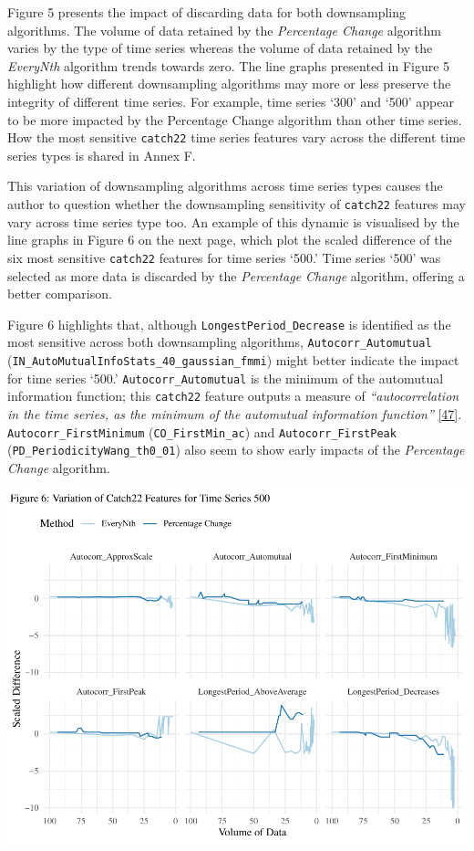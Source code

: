 \documentclass{article}
\begin{document}
Figure 5 presents the impact of discarding data for both downsampling
algorithms. The volume of data retained by the \emph{Percentage Change}
algorithm varies by the type of time series whereas the volume of data
retained by the \emph{EveryNth} algorithm trends towards zero. The line
graphs presented in Figure 5 highlight how different downsampling
algorithms may more or less preserve the integrity of different time
series. For example, time series `300' and `500' appear to be more
impacted by the Percentage Change algorithm than other time series. How
the most sensitive \texttt{catch22} time series features vary across the
different time series types is shared in Annex F.

This variation of downsampling algorithms across time series types
causes the author to question whether the downsampling sensitivity of
\texttt{catch22} features may vary across time series type too. An
example of this dynamic is visualised by the line graphs in Figure 6 on
the next page, which plot the scaled difference of the six most
sensitive \texttt{catch22} features for time series `500.' Time series
`500' was selected as more data is discarded by the \emph{Percentage
Change} algorithm, offering a better comparison.

Figure 6 highlights that, although \texttt{LongestPeriod\_Decrease} is
identified as the most sensitive across both downsampling algorithms,
\texttt{Autocorr\_Automutual}
(\texttt{IN\_AutoMutualInfoStats\_40\_gaussian\_fmmi}) might better
indicate the impact for time series `500.' \texttt{Autocorr\_Automutual}
is the minimum of the automutual information function; this
\texttt{catch22} feature outputs a measure of \emph{``autocorrelation in
the time series, as the minimum of the automutual information
function''} \protect\hyperlink{ref-feature_book}{{[}47{]}}.
\texttt{Autocorr\_FirstMinimum} (\texttt{CO\_FirstMin\_ac}) and
\texttt{Autocorr\_FirstPeak} (\texttt{PD\_PeriodicityWang\_th0\_01})
also seem to show early impacts of the \emph{Percentage Change}
algorithm.

\includegraphics{210431461_CSC8639_Dissertation_files/figure-latex/Catch22Variation-1.pdf}
\end{document}
